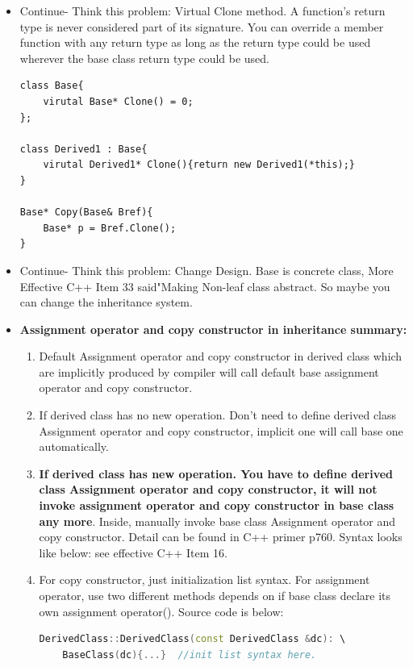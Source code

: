 \documentclass[a4paper,11pt,twoside]{book}
\begin{document}
\begin{itemize}
\item Continue- Think this problem: Virtual Clone method.
	A function's return type is never considered part of its signature. You can override a member function with any return type as long as the return type could be used wherever the base class return type could be used.
\begin{lstlisting}[numbers=none]
class Base{
	virutal Base* Clone() = 0;
};
	
class Derived1 : Base{
	virutal Derived1* Clone(){return new Derived1(*this);}
}
	
Base* Copy(Base& Bref){
	Base* p = Bref.Clone();
}
\end{lstlisting}
	
	\item Continue- Think this problem: Change Design. Base is concrete class,  More Effective C++ Item 33 said"Making Non-leaf class abstract. So maybe you can change the inheritance system.
	
	\item \textbf{Assignment operator and copy constructor in inheritance summary:}

	\begin{enumerate}
		\item Default Assignment  operator and  copy constructor in derived class which are implicitly produced by compiler will call default base assignment operator and  copy constructor.
		
		\item If derived class has no new operation. Don't need to define derived class Assignment  operator and  copy constructor, implicit one will call base one automatically.
		
		\item \textbf{If derived class has new operation. You have to define derived class Assignment  operator and  copy constructor, it will not invoke assignment  operator and  copy constructor in base class any more}.  Inside, manually invoke base class Assignment operator and copy constructor. Detail can be found in C++ primer p760. Syntax looks like below: see effective C++ Item 16.
		
		\item For copy constructor, just initialization list syntax. For assignment operator, use two different methods depends on if base class declare its own assignment operator(). Source code is below:
		
\begin{lstlisting}[frame=single, language=c++]
DerivedClass::DerivedClass(const DerivedClass &dc): \
	BaseClass(dc){...}  //init list syntax here.
		

\end{lstlisting}
\end{enumerate}
\end{itemize}
\end{document}
